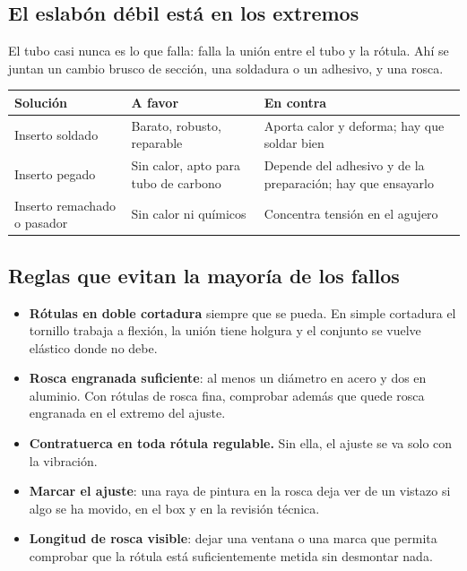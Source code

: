\subsection{El eslabón débil está en los extremos}

El tubo casi nunca es lo que falla: falla la unión entre el tubo y la rótula.
Ahí se juntan un cambio brusco de sección, una soldadura o un adhesivo, y una
rosca.

\begin{center}
\begin{tabularx}{\textwidth}{@{}lXX@{}}
\toprule
\textbf{Solución} & \textbf{A favor} & \textbf{En contra} \\
\midrule
Inserto soldado & Barato, robusto, reparable & Aporta calor y deforma; hay que soldar bien \\
Inserto pegado & Sin calor, apto para tubo de carbono & Depende del adhesivo y de la preparación; hay que ensayarlo \\
Inserto remachado o pasador & Sin calor ni químicos & Concentra tensión en el agujero \\
\bottomrule
\end{tabularx}
\end{center}

\subsection{Reglas que evitan la mayoría de los fallos}

\begin{itemize}
  \item \textbf{Rótulas en doble cortadura} siempre que se pueda. En simple
        cortadura el tornillo trabaja a flexión, la unión tiene holgura y el
        conjunto se vuelve elástico donde no debe.
  \item \textbf{Rosca engranada suficiente}: al menos un diámetro en acero y dos
        en aluminio. Con rótulas de rosca fina, comprobar además que quede rosca
        engranada en el extremo del ajuste.
  \item \textbf{Contratuerca en toda rótula regulable.} Sin ella, el ajuste se
        va solo con la vibración.
  \item \textbf{Marcar el ajuste}: una raya de pintura en la rosca deja ver de un
        vistazo si algo se ha movido, en el box y en la revisión técnica.
  \item \textbf{Longitud de rosca visible}: dejar una ventana o una marca que
        permita comprobar que la rótula está suficientemente metida sin
        desmontar nada.
\end{itemize}

